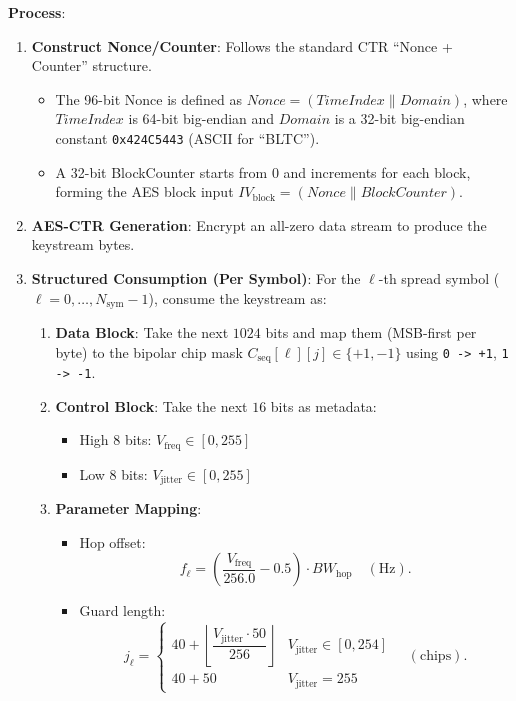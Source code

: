 \documentclass[11pt]{article}
\begin{document}
\textbf{Process}:
\begin{enumerate}
\item \textbf{Construct Nonce/Counter}: Follows the standard CTR ``Nonce + Counter'' structure.
  \begin{itemize}
  \item The 96-bit Nonce is defined as $\mathit{Nonce} = (\mathit{TimeIndex} \parallel \mathit{Domain})$, where $\mathit{TimeIndex}$ is 64-bit big-endian and $\mathit{Domain}$ is a 32-bit big-endian constant \texttt{0x424C5443} (ASCII for ``BLTC'').
  \item A 32-bit BlockCounter starts from 0 and increments for each block, forming the AES block input $\mathit{IV}_{\text{block}} = (\mathit{Nonce} \parallel \mathit{BlockCounter})$.
  \end{itemize}
\item \textbf{AES-CTR Generation}: Encrypt an all-zero data stream to produce the keystream bytes.
\item \textbf{Structured Consumption (Per Symbol)}: For the $\ell$-th spread symbol ($\ell=0,\dots,N_{\text{sym}}-1$), consume the keystream as:
  \begin{enumerate}
  \item \textbf{Data Block}: Take the next $1024$ bits and map them (MSB-first per byte) to the bipolar chip mask $C_{\text{seq}}[\ell][j]\in\{+1,-1\}$ using \texttt{0 -> +1}, \texttt{1 -> -1}.
  \item \textbf{Control Block}: Take the next $16$ bits as metadata:
    \begin{itemize}
    \item High 8 bits: $V_{\text{freq}}\in[0,255]$
    \item Low 8 bits: $V_{\text{jitter}}\in[0,255]$
    \end{itemize}
  \item \textbf{Parameter Mapping}:
    \begin{itemize}
    \item Hop offset:
      \[
        f_\ell=\left(\frac{V_{\text{freq}}}{256.0}-0.5\right)\cdot BW_{\text{hop}}\quad (\text{Hz}).
      \]
    \item Guard length:
      \[
        j_\ell =
        \begin{cases}
        40 + \left\lfloor \dfrac{V_{\text{jitter}}\cdot 50}{256}\right\rfloor & V_{\text{jitter}}\in[0,254] \\
        40 + 50 & V_{\text{jitter}}=255
        \end{cases}
        \quad (\text{chips}).
\]
\end{itemize}
\end{enumerate}
\end{enumerate}
\end{document}

